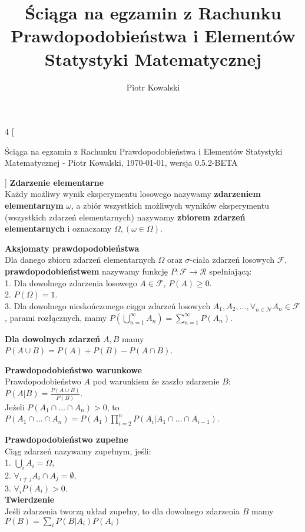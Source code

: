 \documentclass[10pt,landscape,a4paper,notitlepage]{article}
\author{Piotr Kowalski}
\title{Ściąga na egzamin z Rachunku Prawdopodobieństwa i Elementów Statystyki Matematycznej}
\begin{document}
    \begin{multicols*}{4}
        [
        \begin{center}
            Ściąga na egzamin z Rachunku Prawdopodobieństwa i Elementów Statystyki Matematycznej - Piotr Kowalski, \today , wersja 0.5.2-BETA
        \end{center}
        ]
        \noindent\textbf{\large Zdarzenie elementarne}\\
        Każdy możliwy wynik eksperymentu losowego nazywamy \textbf{zdarzeniem elementarnym} $\omega$, a zbiór wszystkich możliwych wyników eksperymentu (wszystkich zdarzeń elementarnych) nazywamy \textbf{zbiorem zdarzeń elementarnych} i oznaczamy $\Omega, (\omega\in\Omega)$.
        
        \noindent\textbf{\large Aksjomaty prawdopodobieństwa}\\
        Dla danego zbioru zdarzeń elementarnych $\Omega$ oraz $\sigma$-ciała zdarzeń losowych $\mathcal{F}$, \textbf{prawdopodobieństwem} nazywamy funkcję $P:\mathcal{F}\rightarrow \mathcal{R}$ spełniającą:\\
        1. Dla dowolnego zdarzenia losowego $A\in\mathcal{F}$, $P(A)\geq 0$.\\
        2. $P(\Omega)=1$.\\
        3. Dla dowolnego nieskończonego ciągu zdarzeń losowych $A_1, A_2, \ldots, \forall_{n\in\mathcal{N}} A_n\in\mathcal{F}$, parami rozłącznych, mamy $P\left(\bigcup^\infty_{n=1}A_n\right)=\sum^\infty_{n=1}P(A_n)$.

        \noindent \textbf{Dla dowolnych zdarzeń} $A, B$ mamy\\ $P(A\cup B)=P(A)+P(B)-P(A\cap B)$.

        \noindent \textbf{\large Prawdopodobieństwo warunkowe}\\
        Prawdopodobieństwo $A$ pod warunkiem że zaszło zdarzenie $B$: $P(A|B)=\frac{P(A\cup B)}{P(B)}$.\\
        Jeżeli $P(A_1\cap \ldots \cap A_n)>0$, to $P(A_1\cap \ldots \cap A_n) = P(A_1)\prod_{i=2}^nP(A_i|A_1 \cap\ldots\cap A_{i-1})$.

        \noindent \textbf{\large Prawdopodobieństwo zupełne}\\
        Ciąg zdarzeń nazywamy zupełnym, jeśli:\\
        1. $\bigcup_i A_i = \Omega$,\\
        2. $\forall_{i\neq j}A_i \cap A_j = \emptyset$,\\
        3. $\forall_i P(A_i)>0$.\\
        \textbf{Twierdzenie}\\
        Jeśli zdarzenia tworzą układ zupełny, to dla dowolnego zdarzenia $B$ mamy $P(B)=\sum_iP(B|A_i)P(A_i)$


\end{multicols*}
\end{document}
